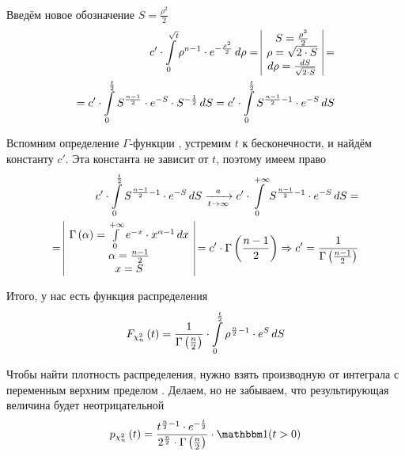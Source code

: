 Введём новое обозначение $S = \frac{\rho^2}{2}$
\begin{align*}
    c' \cdot \integral{0}{\sqrt{t}}{\rho}{
        \rho^{n-1} \cdot e^{- \frac{\rho^2}{2}}}
    = \begin{array}{|c|}
        S = \frac{\rho^2}{2} \\
        \rho = \sqrt{2 \cdot S} \\
        d\rho = \frac{dS}{\sqrt{2 \cdot S}}
    \end{array} = \\
    = c' \cdot \integral{0}{\frac{t}{2}}{S}{
        S^{\frac{n-1}{2}} \cdot e^{-S} \cdot S^{-\frac{1}{2}}}
    = c' \cdot \integral{0}{\frac{t}{2}}{S}{
        S^{\frac{n-1}{2} - 1} \cdot e^{-S}}
\end{align*}

Вспомним определение $\Gamma$-функции \cite[с.~416]{DorogovtsevMA}, устремим
$t$ к бесконечности, и найдём константу $c'$. Эта константа не зависит от
$t$, поэтому имеем право
\begin{align*}
    c' \cdot \integral{0}{\frac{t}{2}}{S}{
        S^{\frac{n-1}{2} - 1} \cdot e^{-S}}
    \covergencen{t}{a}
    c' \cdot \integral{0}{+\infty}{S}{
        S^{\frac{n-1}{2} - 1} \cdot e^{-S}} = \\
    = \begin{array}{|c|}
        \Gamma\left( \alpha \right)
            = \integral{0}{+\infty}{x}{e^{-x} \cdot x^{\alpha-1}} \\
        \alpha = \frac{n-1}{2} \\
        x = S
    \end{array}
    = c' \cdot \Gamma\left( \frac{n-1}{2} \right)
    \Rightarrow c' = \frac{1}{\Gamma\left( \frac{n-1}{2} \right)}
\end{align*}

Итого, у нас есть функция распределения
\begin{align*}
    \cdfof{\chi_n^2}{t}
    =  \frac{1}{\Gamma\left( \frac{n}{2} \right)} \cdot
        \integral{0}{\frac{t}{2}}{S}{\rho^{\frac{n}{2}-1} \cdot e^S}
\end{align*}

Чтобы найти плотность распределения, нужно взять производную от интеграла
с переменным верхним пределом \cite[с.~353]{IlinMA1}. Делаем, но не забываем,
что результирующая величина будет неотрицательной
\begin{align*}
    \pdfof{\chi_n^2}{t}
    = \frac{t^{\frac{n}{2}-1} \cdot e^{-\frac{t}{2}}}{
            2^{\frac{n}{2}} \cdot \Gamma\left( \frac{n}{2} \right)}
        \cdot \indicator{t>0}
\end{align*}

